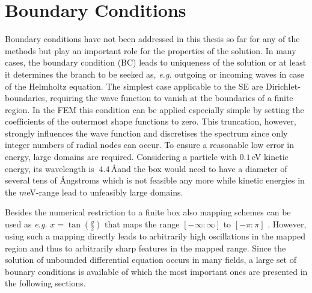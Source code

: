 \section{Boundary Conditions}
\label{ch:BC}
Boundary conditions have not been addressed in this thesis so far for any of the methods but play an important role for the properties of the solution.
In many cases, the boundary condition (BC) leads to uniqueness of the solution or at least it determines the branch to be seeked as, \textit{e.g.} outgoing or incoming waves in case of the Helmholtz equation.
The simplest case applicable to the SE are Dirichlet-boundaries, requiring the wave function to vanish at the boundaries of a finite region.
In the FEM this condition can be applied especially simple by setting the coefficients of the outermost shape functions to zero.
This truncation, however, strongly influences the wave function and discretises the spectrum since only integer numbers of radial nodes can occur.
To ensure a reasonable low error in energy, large domains are required.
Considering a particle with $0.1\,$eV kinetic energy, its wavelength is $~4.4\,$\AA and the box would need to have a diameter of several tens of \AA ngstroms which is not feasible any more while kinetic energies in the $m$eV-range lead to unfeasibly large domains.


Besides the numerical restriction to a finite box also mapping schemes can be used as \textit{e.g.} $x=\tan (\frac y2)$ that maps the range $[-\infty:\infty]$ to $[-\pi:\pi]$ \cite{PSbook}.
However, using such a mapping directly leads to arbitrarily high oscillations in the mapped region and thus to arbitrarily sharp features in the mapped range. %
Since the solution of unbounded differential equation occurs in many fields, a large set of bounary conditions is available of which the most important ones are presented in the following sections.

